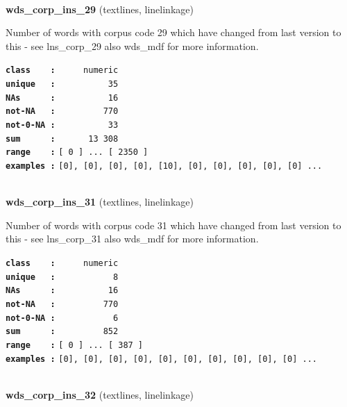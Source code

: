 \documentclass[]{article}
\begin{document}
~

\textbf{wds\_corp\_ins\_29} (textlines, linelinkage)

Number of words with corpus code 29 which have changed from last version
to this - see lns\_corp\_29 also wds\_mdf for more information.

\textbf{\texttt{class\ \ \ \ :}} \texttt{~~~~~numeric}\\
\textbf{\texttt{unique\ \ \ :}} \texttt{~~~~~~~~~~35}\\
\textbf{\texttt{NAs\ \ \ \ \ \ :}} \texttt{~~~~~~~~~~16}\\
\textbf{\texttt{not-NA\ \ \ :}} \texttt{~~~~~~~~~770}\\
\textbf{\texttt{not-0-NA\ :}} \texttt{~~~~~~~~~~33}\\
\textbf{\texttt{sum\ \ \ \ \ \ :}} \texttt{~~~~~~13~308}\\
\textbf{\texttt{range\ \ \ \ :}}
\texttt{{[}\ 0\ {]}\ ...\ {[}\ 2350\ {]}}\\
\textbf{\texttt{examples\ :}}
\texttt{{[}0{]},\ {[}0{]},\ {[}0{]},\ {[}0{]},\ {[}10{]},\ {[}0{]},\ {[}0{]},\ {[}0{]},\ {[}0{]},\ {[}0{]}\ ...}\\

~

\textbf{wds\_corp\_ins\_31} (textlines, linelinkage)

Number of words with corpus code 31 which have changed from last version
to this - see lns\_corp\_31 also wds\_mdf for more information.

\textbf{\texttt{class\ \ \ \ :}} \texttt{~~~~~numeric}\\
\textbf{\texttt{unique\ \ \ :}} \texttt{~~~~~~~~~~~8}\\
\textbf{\texttt{NAs\ \ \ \ \ \ :}} \texttt{~~~~~~~~~~16}\\
\textbf{\texttt{not-NA\ \ \ :}} \texttt{~~~~~~~~~770}\\
\textbf{\texttt{not-0-NA\ :}} \texttt{~~~~~~~~~~~6}\\
\textbf{\texttt{sum\ \ \ \ \ \ :}} \texttt{~~~~~~~~~852}\\
\textbf{\texttt{range\ \ \ \ :}}
\texttt{{[}\ 0\ {]}\ ...\ {[}\ 387\ {]}}\\
\textbf{\texttt{examples\ :}}
\texttt{{[}0{]},\ {[}0{]},\ {[}0{]},\ {[}0{]},\ {[}0{]},\ {[}0{]},\ {[}0{]},\ {[}0{]},\ {[}0{]},\ {[}0{]}\ ...}\\

~

\textbf{wds\_corp\_ins\_32} (textlines, linelinkage)
\end{document}
